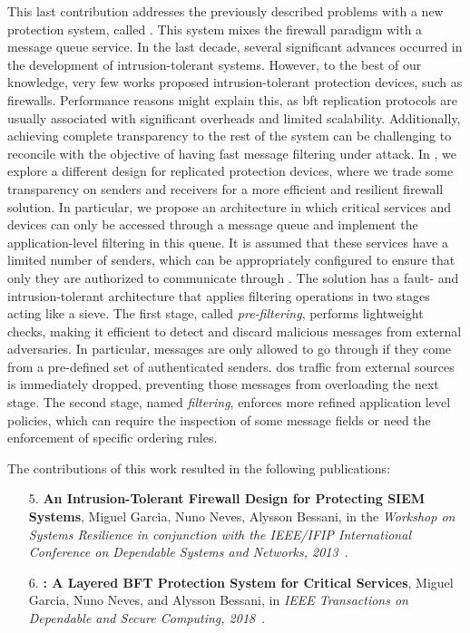 This last contribution addresses the previously described problems with a new protection system, called \sieveq.
This system mixes the firewall paradigm with a message queue service.
In the last decade, several significant advances occurred in the development of intrusion-tolerant systems.
However, to the best of our knowledge, very few works proposed intrusion-tolerant protection devices, such as firewalls.
Performance reasons might explain this, as \gls{bft} replication protocols are usually associated with significant overheads and limited scalability.
Additionally, achieving complete transparency to the rest of the system can be challenging to reconcile with the objective of having fast message filtering under attack.
In \sieveq, we explore a different design for replicated protection devices, where we trade some transparency on senders and receivers for a more efficient and resilient firewall solution.
In particular, we propose an architecture in which critical services and devices can only be accessed through a message queue and implement the application-level filtering in this queue.
It is assumed that these services have a limited number of senders, which can be appropriately configured to ensure that only they are authorized to communicate through \sieveq.
The solution has a fault- and intrusion-tolerant architecture that applies filtering operations in two stages acting like a sieve.
The first stage, called \emph{pre-filtering}, performs lightweight checks, making it efficient to detect and discard malicious messages from external adversaries.
In particular, messages are only allowed to go through if they come from a pre-defined set of authenticated senders.
\gls{dos} traffic from external sources is immediately dropped, preventing those messages from overloading the next stage.
The second stage, named \emph{filtering}, enforces more refined application level policies, which can require the inspection of some message fields or need the enforcement of specific ordering rules.

The contributions of this work resulted in the following publications:

\begin{enumerate}
\item[5.] \textbf{An Intrusion-Tolerant Firewall Design for Protecting SIEM Systems}, Miguel Garcia, Nuno Neves, Alysson Bessani, in the \emph{Workshop on Systems Resilience in conjunction with the IEEE/IFIP International Conference on Dependable Systems and Networks, 2013}~\cite{Garcia:2013}.

\item[6.] \textbf{\sieveq: A Layered BFT Protection System for Critical Services}, Miguel Garcia, Nuno Neves, and Alysson Bessani, in \emph{IEEE Transactions on Dependable and Secure Computing, 2018}~\cite{Garcia:2016}.
\end{enumerate}


